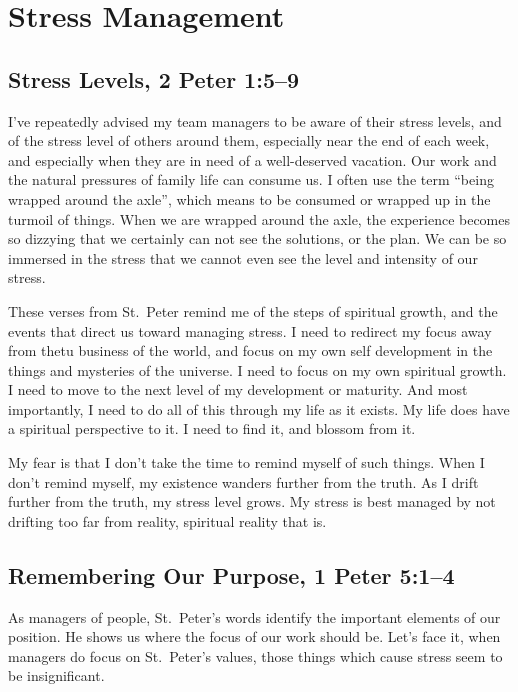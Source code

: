 \documentclass[12pt]{memoir}
\begin{document}
\section{Stress Management}

\subsection[Stress Levels]{Stress Levels, 2 Peter 1:5--9}

I've repeatedly advised my team managers to be aware of their stress
levels, and of the stress level of others around them, especially
near the end of each week, and especially when they are in need of
a well-deserved vacation. Our work and the natural pressures of family life can consume us. I often use the term ``being wrapped around the
axle'', which means to be consumed or wrapped up in the turmoil of
things. When we are wrapped around the axle, the experience becomes so dizzying that we certainly can not see the solutions, or the plan. We can be so immersed in the stress that we cannot even
see the level and intensity of our stress. 

These verses from St.\ Peter remind me of the steps of spiritual growth,
and the events that direct us toward managing stress. I need to redirect
my focus away from thetu business of the world, and focus on my own
self development in the things and mysteries of the universe. I need
to focus on my own spiritual growth. I need to move to the next level
of my development or maturity. And most importantly, I need to do
all of this through my life as it exists. My life does have a spiritual
perspective to it. I need to find it, and blossom from it.

My fear is that I don't take the time to remind myself of such things.
When I don't remind myself, my existence wanders further from the
truth. As I drift further from the truth, my stress level grows. My
stress is best managed by not drifting too far from reality, spiritual
reality that is.

\subsection[Remembering Our Purpose]{Remembering Our Purpose, 1 Peter 5:1--4}

As managers of people, St.\ Peter's words identify the important elements
of our position. He shows us where the focus of our work should be.
Let's face it, when managers do focus on St.\ Peter's values, those
things which cause stress seem to be insignificant. 
\end{document}
